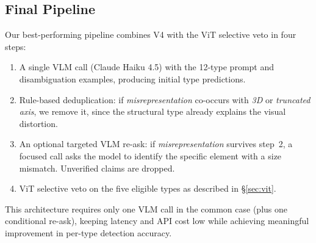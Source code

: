 \subsection{Final Pipeline}
\label{sec:best}

Our best-performing pipeline combines V4 with the ViT selective veto in four steps:

\begin{enumerate}[nosep]
  \item A single VLM call (Claude Haiku 4.5) with the 12-type prompt and disambiguation examples, producing initial type predictions.
  \item Rule-based deduplication: if \textit{misrepresentation} co-occurs with \textit{3D} or \textit{truncated axis}, we remove it, since the structural type already explains the visual distortion.
  \item An optional targeted VLM re-ask: if \textit{misrepresentation} survives step~2, a focused call asks the model to identify the specific element with a size mismatch. Unverified claims are dropped.
  \item ViT selective veto on the five eligible types as described in \S\ref{sec:vit}.
\end{enumerate}

This architecture requires only one VLM call in the common case (plus one conditional re-ask), keeping latency and API cost low while achieving meaningful improvement in per-type detection accuracy.

